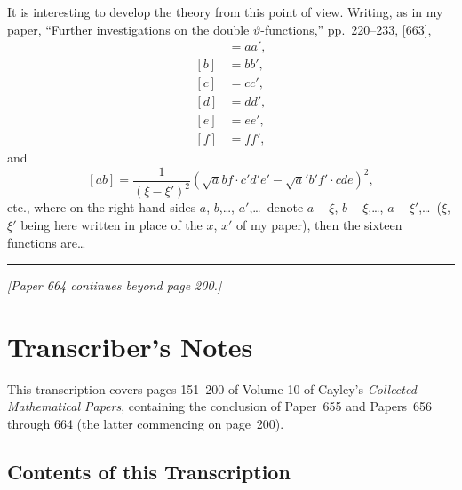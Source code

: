 \documentclass[11pt,a4paper]{article}
\theoremstyle{plain}
\theoremstyle{definition}
\newcommand{\te}{\vartheta} %
\begin{document}
It is interesting to develop the theory from this point of view. Writing, as in my paper, ``Further investigations on the double $\te$-functions,'' pp.~220--233, [663],
\begin{align*}
[a] &= aa', \\
[b] &= bb', \\
[c] &= cc', \\
[d] &= dd', \\
[e] &= ee', \\
[f] &= ff',
\end{align*}
and
\[
[ab] = \frac{1}{(\xi - \xi')^2} (\surd abf \cdot c'd'e' - \surd a'b'f' \cdot cde)^2,
\]
etc., where on the right-hand sides $a$, $b$,\ldots, $a'$,\ldots\ denote $a - \xi$, $b - \xi$,\ldots, $a - \xi'$,\ldots\ ($\xi$, $\xi'$ being here written in place of the $x$, $x'$ of my paper), then the sixteen functions are\ldots

\smallskip
\noindent\rule{0.6\textwidth}{0.4pt}

\begin{center}
\textit{[Paper 664 continues beyond page 200.]}
\end{center}

\newpage
\section*{Transcriber's Notes}

This transcription covers pages 151--200 of Volume 10 of Cayley's \emph{Collected Mathematical Papers}, containing the conclusion of Paper~655 and Papers~656 through 664 (the latter commencing on page~200).

\subsection*{Contents of this Transcription}
\end{document}
